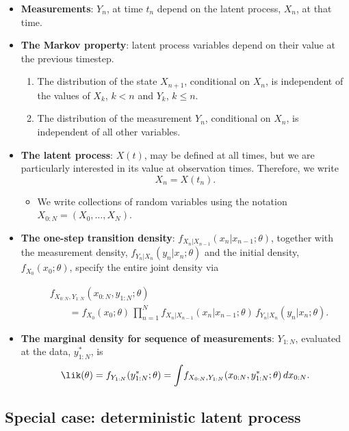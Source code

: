 \documentclass[
  letterpaper,
  DIV=11,
  numbers=noendperiod]{scrartcl}
\providecommand{\tightlist}{%
  \setlength{\itemsep}{0pt}\setlength{\parskip}{0pt}}\usepackage{longtable,booktabs,array}
\begin{document}
\begin{itemize}
\item
  \textbf{Measurements}: \(Y_n\), at time \(t_n\) depend on the latent
  process, \(X_n\), at that time.
\item
  \textbf{The Markov property}: latent process variables depend on their
  value at the previous timestep.

  \begin{enumerate}
  \def\labelenumi{\arabic{enumi}.}
  \tightlist
  \item
    The distribution of the state \(X_{n+1}\), conditional on \(X_{n}\),
    is independent of the values of \(X_{k}\), \(k<n\) and \(Y_{k}\),
    \(k\le n\).
  \item
    The distribution of the measurement \(Y_{n}\), conditional on
    \(X_{n}\), is independent of all other variables.
  \end{enumerate}
\item
  \textbf{The latent process}: \(X(t)\), may be defined at all times,
  but we are particularly interested in its value at observation times.
  Therefore, we write \[X_n=X(t_n).\]

  \begin{itemize}
  \tightlist
  \item
    We write collections of random variables using the notation
    \(X_{0:N}=(X_0,\dots,X_N)\).
  \end{itemize}
\item
  \textbf{The one-step transition density}:
  \(f_{X_n|X_{n-1}}(x_n|x_{n-1};\theta)\), together with the measurement
  density, \(f_{Y_n|X_n}(y_n|x_n;\theta)\) and the initial density,
  \(f_{X_0}(x_0;\theta)\), specify the entire joint density via

  \[
    \begin{split}
            &f_{X_{0:N},Y_{1:N}}(x_{0:N},y_{1:N};\theta)\\
            & \qquad = f_{X_0}(x_0;\theta)\,\prod_{n=1}^N\!f_{X_n | X_{n-1}}(x_n|x_{n-1};\theta)\,f_{Y_n|X_n}(y_n|x_n;\theta).
    \end{split}
  \]
\item
  \textbf{The marginal density for sequence of measurements}:
  \(Y_{1:N}\), evaluated at the data, \(y_{1:N}^*\), is \[
    \lik(\theta) = f_{Y_{1:N}}(y^*_{1:N};\theta)=\int\!f_{X_{0:N},Y_{1:N}}(x_{0:N},y^*_{1:N};\theta)\, dx_{0:N}.
  \]
\end{itemize}

\hypertarget{special-case-deterministic-latent-process}{%
\subsection{Special case: deterministic latent
process}\label{special-case-deterministic-latent-process}}
\end{document}
